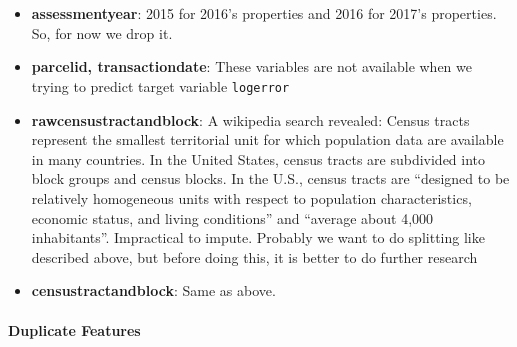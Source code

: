 \documentclass[11pt]{article}
\providecommand{\tightlist}{%
      \setlength{\itemsep}{0pt}\setlength{\parskip}{0pt}}
\begin{document}
    \begin{center}
    \end{center}
    { \hspace*{\fill} \\}
    
    \begin{center}
    \end{center}
    { \hspace*{\fill} \\}
    
    \begin{itemize}
\item
  \textbf{assessmentyear}: 2015 for 2016's properties and 2016 for
  2017's properties. So, for now we drop it.
\item
  \textbf{parcelid, transactiondate}: These variables are not available
  when we trying to predict target variable \texttt{logerror}
\end{itemize}

    \begin{itemize}
\tightlist
\item
  \textbf{rawcensustractandblock}: A wikipedia search revealed: Census
  tracts represent the smallest territorial unit for which population
  data are available in many countries. In the United States, census
  tracts are subdivided into block groups and census blocks. In the
  U.S., census tracts are ``designed to be relatively homogeneous units
  with respect to population characteristics, economic status, and
  living conditions'' and ``average about 4,000 inhabitants''.
  Impractical to impute. Probably we want to do splitting like described
  above, but before doing this, it is better to do further research
\item
  \textbf{censustractandblock}: Same as above.
\end{itemize}

    \hypertarget{duplicate-features}{%
\paragraph{Duplicate Features}\label{duplicate-features}}
\end{document}
